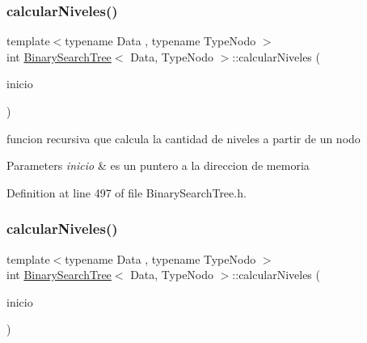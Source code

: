 \subsubsection{\texorpdfstring{calcular\+Niveles()}{calcularNiveles()}\hspace{0.1cm}{\footnotesize\ttfamily [1/2]}}
{\footnotesize\ttfamily template$<$typename Data , typename Type\+Nodo $>$ \\
int \hyperlink{class_binary_search_tree}{Binary\+Search\+Tree}$<$ Data, Type\+Nodo $>$\+::calcular\+Niveles (\begin{DoxyParamCaption}\item[{\hyperlink{class_class_node}{Class\+Node}$<$ Data $>$ $\ast$}]{inicio }\end{DoxyParamCaption})\hspace{0.3cm}{\ttfamily [inline]}}



funcion recursiva que calcula la cantidad de niveles a partir de un nodo 


\begin{DoxyParams}{Parameters}
{\em inicio} & es un puntero a la direccion de memoria \\
\hline
\end{DoxyParams}


Definition at line 497 of file Binary\+Search\+Tree.\+h.

\mbox{\label{class_binary_search_tree_a922ad2464f2085d208847a76fca1bb51}} 
\subsubsection{\texorpdfstring{calcular\+Niveles()}{calcularNiveles()}\hspace{0.1cm}{\footnotesize\ttfamily [2/2]}}
{\footnotesize\ttfamily template$<$typename Data , typename Type\+Nodo $>$ \\
int \hyperlink{class_binary_search_tree}{Binary\+Search\+Tree}$<$ Data, Type\+Nodo $>$\+::calcular\+Niveles (\begin{DoxyParamCaption}\item[{\hyperlink{class_class_node}{Class\+Node}$<$ Data $>$ $\ast$}]{inicio }\end{DoxyParamCaption})\hspace{0.3cm}{\ttfamily [inline]}}



